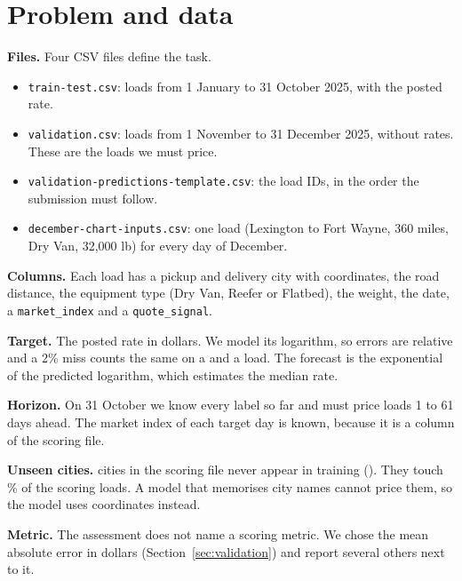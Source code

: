 \section{Problem and data}

\textbf{Files.} Four CSV files define the task.
\begin{itemize}
  \item \texttt{train-test.csv}: \NTrain{} loads from 1 January to 31 October 2025, with the posted rate.
  \item \texttt{validation.csv}: \NValidation{} loads from 1 November to 31 December 2025, without rates. These are
        the loads we must price.
  \item \texttt{validation-predictions-template.csv}: the load IDs, in the order the submission must follow.
  \item \texttt{december-chart-inputs.csv}: one load (Lexington to Fort Wayne, 360 miles, Dry Van, 32,000 lb)
        for every day of December.
\end{itemize}

\textbf{Columns.} Each load has a pickup and delivery city with coordinates, the road distance, the equipment type
(Dry Van, Reefer or Flatbed), the weight, the date, a \texttt{market\_index} and a \texttt{quote\_signal}.

\textbf{Target.} The posted rate in dollars. We model its logarithm, so errors are relative and a 2\% miss counts
the same on a  and a  load. The forecast is the exponential of the predicted logarithm, which
estimates the median rate.

\textbf{Horizon.} On 31 October we know every label so far and must price loads 1 to 61 days ahead.
The market index of each target day is known, because it is a column of the scoring file.

\textbf{Unseen cities.} \UnseenCities{} cities in the scoring file never appear in training (\UnseenCityList).
They touch \UnseenShare\% of the scoring loads. A model that memorises city names cannot price them, so the model
uses coordinates instead.

\textbf{Metric.} The assessment does not name a scoring metric. We chose the mean absolute error in dollars
(Section~\ref{sec:validation}) and report several others next to it.
